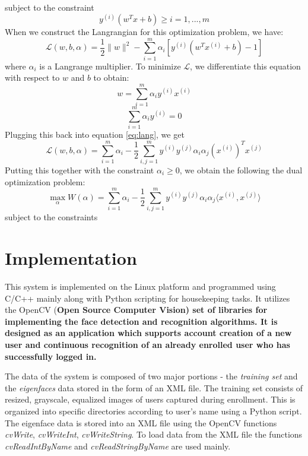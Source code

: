\documentclass[%
        final,
        notitlepage,
        narroweqnarray,
        inline,
        ]{ieee}
\begin{document}
subject to the constraint
\begin{equation}
y^{(i)}(w^Tx + b) \geq i = 1, ..., m
\end{equation}
When we construct the Langrangian for this optimization problem, we have:
\begin{equation} \label{eq:lang}
\mathcal {L}(w, b, \alpha) = \frac{1}{2} \parallel w \parallel ^2 - \sum_{i=1}^{m} \alpha_i [y^{(i)}(w^Tx^{(i)} + b) - 1]
\end{equation}
where $\alpha_{i}$ is a Langrange multiplier. To minimize $\mathcal{L}$, we differentiate this equation with respect to $w$ and $b$ to obtain:
\begin{equation} \label{eq:w}
w = \sum_{i=1}^{m} \alpha_{i} y^{(i)} x^{(i)}
\end{equation}
\begin{equation} \label{eq:ay}
\sum_{i=1}^{m} \alpha_{i} y^{(i)} = 0
\end{equation}
Plugging this back into equation \ref{eq:lang}, we get
\begin{equation}
\mathcal {L}(w, b, \alpha) = \sum_{i=1}^{m} \alpha_i - \frac{1}{2} \sum_{i,j=1}^{m} y^{(i)}y^{(j)}\alpha_i \alpha_j (x^{(i)})^T x^{(j)}
\end{equation}
Putting this together with the constraint $\alpha_i \geq 0$, we obtain the following the dual optimization problem:
\begin{equation} \label{eq:dual}
\max_{\alpha} W(\alpha) = \sum_{i=1}^{m} \alpha_i - \frac{1}{2} \sum_{i,j=1}^{m} y^{(i)}y^{(j)}\alpha_i \alpha_j \langle x^{(i)}, x^{(j)}\rangle
\end{equation}
subject to the constraints
\section{Implementation}
This system is implemented on the Linux platform and programmed using C/C++ mainly along with Python scripting for housekeeping tasks. It utilizes the OpenCV (\bf{O}pen Source \bf{C}omputer \bf{V}ision) \cite{opencv} set of libraries for implementing the face detection and recognition algorithms. It is designed as an application which supports account creation of a new user and continuous recognition of an already enrolled user who has successfully logged in. 

The data of the system is composed of two major portions - the \emph{training set} and the \emph{eigenfaces} data stored in the form of an XML file. The training set consists of resized, grayscale, equalized images of users captured during enrollment. This is organized into specific directories according to user's name using a Python script. The eigenface data is stored into  an XML file using the OpenCV functions \emph{cvWrite}, \emph{cvWriteInt}, \emph{cvWriteString}. To load data from the XML file the functions \emph{cvReadIntByName} and \emph{cvReadStringByName} are used mainly.
\end{document}
